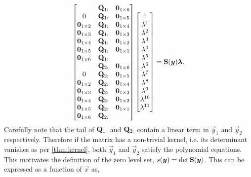 \begin{equation}
    \begin{bmatrix}
        & \mathbf{Q}_{1:} & \bm{0}_{1\times 6} \\
        0 & \mathbf{Q}_{1:} & \bm{0}_{1\times 5} \\
        \bm{0}_{1\times 2} & \mathbf{Q}_{1:} & \bm{0}_{1\times 4} \\
        \bm{0}_{1\times 3} & \mathbf{Q}_{1:} & \bm{0}_{1\times 3} \\
        \bm{0}_{1\times 4} & \mathbf{Q}_{1:} & \bm{0}_{1\times 2} \\
        \bm{0}_{1\times 5} & \mathbf{Q}_{1:} & \bm{0}_{1\times 1} \\
        \bm{0}_{1\times 6} & \mathbf{Q}_{1:} & \\
        & \mathbf{Q}_{2:} & \bm{0}_{1\times 6} \\
        0 & \mathbf{Q}_{2:} & \bm{0}_{1\times 5} \\
        \bm{0}_{1\times 2} & \mathbf{Q}_{2:} & \bm{0}_{1\times 4} \\
        \bm{0}_{1\times 3} & \mathbf{Q}_{2:} & \bm{0}_{1\times 3} \\
        \bm{0}_{1\times 4} & \mathbf{Q}_{2:} & \bm{0}_{1\times 2} \\
        \bm{0}_{1\times 5} & \mathbf{Q}_{2:} & \bm{0}_{1\times 1} \\
        \bm{0}_{1\times 6} & \mathbf{Q}_{2:} & \\
    \end{bmatrix}
    \begin{bmatrix}
        1 \\
        \lambda^1 \\
        \lambda^2 \\
        \lambda^3 \\
        \lambda^4 \\
        \lambda^5 \\
        \lambda^6 \\
        \lambda^7 \\
        \lambda^8 \\
        \lambda^9 \\
        \lambda^{10} \\
        \lambda^{11}
    \end{bmatrix}
    =
    \mathbf{S}(\bm{y})\bm{\lambda}.
    \label{eqn:inhomog_poly}
\end{equation}
Carefully note that the tail of $\mathbf{Q}_{1:}$ and $\mathbf{Q}_{2:}$ contain a linear term in $\vec{y}_1$ and $\vec{y}_2$ respectively. Therefore if the matrix has a non-trivial kernel, i.e. its determinant vanishes as per \eqref{thm:kernel}, both $\vec{y}_1$ and $\vec{y}_2$ satisfy the polynomial equations. This motivates the definition of the zero level set, $s(\bm{y}) = \det\mathbf{S}(\bm{y})$. This can be expressed as a function of $\vec{x}$ as,
